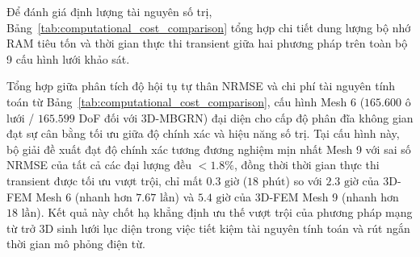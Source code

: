 Để đánh giá định lượng tài nguyên số trị, Bảng~\ref{tab:computational_cost_comparison} tổng hợp chi tiết dung lượng bộ nhớ RAM tiêu tốn và thời gian thực thi transient giữa hai phương pháp trên toàn bộ 9 cấu hình lưới khảo sát.
\begin{table}[htbp]
\caption{Memory Usage and Execution Time Comparison Between 3D-MBGRN and 3D-FEM Across 9 Mesh Configurations}
\label{tab:computational_cost_comparison}
\centering
{}
\end{table}

Tổng hợp giữa phân tích độ hội tụ tự thân NRMSE và chi phí tài nguyên tính toán từ Bảng~\ref{tab:computational_cost_comparison}, cấu hình Mesh 6 ($165.600$ ô lưới / $165.599$ DoF đối với 3D-MBGRN) đại diện cho cấp độ phân đĩa không gian đạt sự cân bằng tối ưu giữa độ chính xác và hiệu năng số trị. Tại cấu hình này, bộ giải đề xuất đạt độ chính xác tương đương nghiệm mịn nhất Mesh 9 với sai số NRMSE của tất cả các đại lượng đều $< 1.8\%$, đồng thời thời gian thực thi transient được tối ưu vượt trội, chỉ mất $0.3\text{ giờ}$ ($18\text{ phút}$) so với $2.3\text{ giờ}$ của 3D-FEM Mesh 6 (nhanh hơn $7.67\text{ lần}$) và $5.4\text{ giờ}$ của 3D-FEM Mesh 9 (nhanh hơn $18\text{ lần}$). Kết quả này chốt hạ khẳng định ưu thế vượt trội của phương pháp mạng từ trở 3D sinh lưới lục diện trong việc tiết kiệm tài nguyên tính toán và rút ngắn thời gian mô phỏng điện từ.